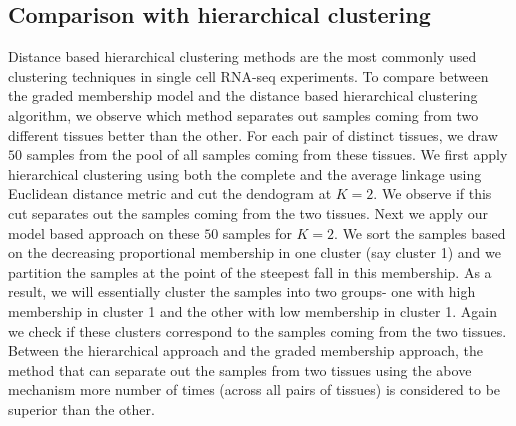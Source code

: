 \subsection{Comparison with hierarchical clustering}

Distance based hierarchical clustering methods are the most commonly used clustering techniques in single cell RNA-seq experiments. To compare between the graded membership model and the distance based hierarchical clustering algorithm, we observe which method separates out samples coming from two different tissues better than the other. For each pair of distinct tissues,  we draw $50$ samples from the pool of all samples coming from these tissues. We first apply hierarchical clustering using both the complete and the average linkage using Euclidean distance metric and cut the dendogram at $K=2$.  We observe if this cut separates out the samples coming from the two tissues.  Next we apply our model based approach on these $50$ samples for $K=2$. We sort the samples based on the decreasing  proportional membership in one cluster (say cluster 1) and we partition the samples at the point of the steepest fall in this membership. As a result, we will essentially cluster the samples into two groups- one with high membership in cluster 1 and the other with low membership in cluster 1. Again we check if  these clusters correspond to the samples coming from the two tissues. Between the hierarchical approach and the graded membership approach, the method that can separate out the samples from two tissues using the above mechanism more number of times (across all pairs of tissues) is considered to be superior than the other. 

%






\medskip
















 









